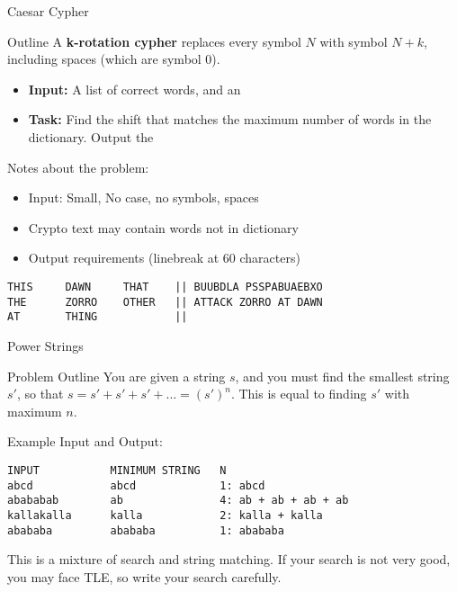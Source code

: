 \begin{frame}[fragile]{Caesar Cypher}

  {\smaller
  \begin{exampleblock}{Outline}
    A {\bf k-rotation cypher} replaces every symbol $N$ with symbol $N+k$,
    including spaces (which are symbol 0).
    \begin{itemize}
    \item {\bf Input:} A list of correct words, and an 
    \item {\bf Task:} Find the shift that matches the maximum number of words in the dictionary. Output the 
    \end{itemize}

    \medskip

    Notes about the problem:
    \begin{itemize}
    \item Input: Small, No case, no symbols, spaces
    \item Crypto text may contain words not in dictionary
    \item Output requirements (linebreak at 60 characters)
    \end{itemize}
  \end{exampleblock}

\begin{verbatim}
THIS     DAWN     THAT    || BUUBDLA PSSPABUAEBXO
THE      ZORRO    OTHER   || ATTACK ZORRO AT DAWN
AT       THING            ||
\end{verbatim}}

\end{frame}

\begin{frame}[fragile]{Power Strings}
    \begin{exampleblock}{Problem Outline}
      You are given a string $s$, and you must find the smallest string $s'$, so that $s = s'+s'+s'+\ldots = (s')^n$. This is equal to finding $s'$ with maximum $n$.
    \end{exampleblock}
    \bigskip

Example Input and Output:
\begin{verbatim}
INPUT           MINIMUM STRING   N
abcd            abcd             1: abcd
abababab        ab               4: ab + ab + ab + ab
kallakalla      kalla            2: kalla + kalla
abababa         abababa          1: abababa
\end{verbatim}\bigskip

This is a mixture of search and string matching. If your search is not very good, you may face TLE, so write your search carefully.
\end{frame}

